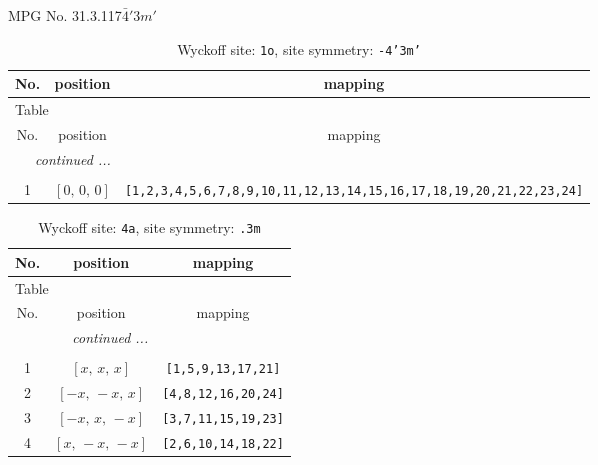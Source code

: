 \documentclass[fleqn,8pt]{jsarticle}
\begin{document}
\setcounter{MaxMatrixCols}{32}

\renewcommand{\tablename}{Table~}
\renewcommand{\figurename}{Figure~}
\begin{center}
\LARGE
MPG No. 31.3.117\quad$\bar{4}'3m'$
\end{center}
\renewcommand{\arraystretch}{1.2}
\begin{longtable}{ccc}
\caption{Wyckoff site: {\tt 1o}, site symmetry: {\tt -4'3m'}}
 \\
 \hline \hline
No. & position & mapping \\ \hline \endfirsthead

\multicolumn{2}{l}{\tablename\ \thetable{}} \\
 \hline \hline
No. & position & mapping \\ \hline \endhead

 \hline \hline
\multicolumn{2}{r}{\footnotesize\it continued ...} \\ \endfoot

 \hline \hline
\multicolumn{2}{r}{} \\ \endlastfoot

1 & $\left[ 0,\, 0,\, 0 \right]$ & {\tt [1,2,3,4,5,6,7,8,9,10,11,12,13,14,15,16,17,18,19,20,21,22,23,24]} \\
\end{longtable}
\renewcommand{\arraystretch}{1.2}
\begin{longtable}{ccc}
\caption{Wyckoff site: {\tt 4a}, site symmetry: {\tt .3m}}
 \\
 \hline \hline
No. & position & mapping \\ \hline \endfirsthead

\multicolumn{2}{l}{\tablename\ \thetable{}} \\
 \hline \hline
No. & position & mapping \\ \hline \endhead

 \hline \hline
\multicolumn{2}{r}{\footnotesize\it continued ...} \\ \endfoot

 \hline \hline
\multicolumn{2}{r}{} \\ \endlastfoot

1 & $\left[ x,\, x,\, x \right]$ & {\tt [1,5,9,13,17,21]} \\ \hline
2 & $\left[ - x,\, - x,\, x \right]$ & {\tt [4,8,12,16,20,24]} \\ \hline
3 & $\left[ - x,\, x,\, - x \right]$ & {\tt [3,7,11,15,19,23]} \\ \hline
4 & $\left[ x,\, - x,\, - x \right]$ & {\tt [2,6,10,14,18,22]} \\
\end{longtable}
\end{document}
